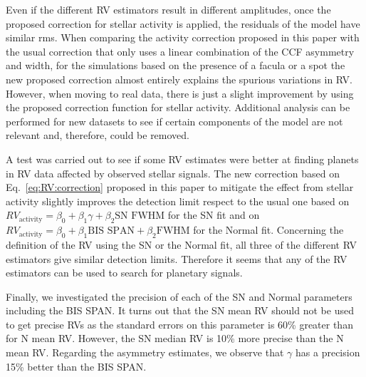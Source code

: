 \documentclass{aa}
\begin{document}
Even if the different RV estimators result in different amplitudes, once the proposed correction for stellar activity is applied, the residuals of the model have similar rms.
When comparing the activity correction proposed in this paper with the usual correction that only uses a linear combination of the CCF asymmetry and width, for the simulations based on the presence of a facula or a spot the new proposed correction almost entirely explains the spurious variations in RV. However, when moving to real data, there is just a slight improvement by using the proposed correction function for stellar activity. 
Additional analysis can be performed for new datasets to see if certain components of the model are not relevant and, therefore, could be removed.

A test was carried out to see if some RV estimates were better at finding planets in RV data affected by observed stellar signals. The new correction based on Eq.~\eqref{eq:RV:correction} proposed in this paper to mitigate the effect from stellar activity slightly improves the detection limit respect to the usual one based on $RV_{\text{activity}}=\beta_0+\beta_1 \gamma + \beta_2 \text{SN FWHM}$ for the SN fit and on $RV_{\text{activity}}=\beta_0+\beta_1 \text{BIS SPAN} + \beta_2 \text{FWHM}$ for the Normal fit.
Concerning the definition of the RV using the SN or the Normal fit, all three of the different RV estimators give similar detection limits. Therefore it seems that any of the RV estimators can be used to search for planetary signals.

Finally, we investigated the precision of each of the SN and Normal parameters including the BIS SPAN. It turns out that the SN mean RV should not be used to get precise RVs as the standard errors on this parameter is 60\% greater than for N mean RV. 
However, the SN median RV is 10\% more precise than the N mean RV. 
Regarding the asymmetry estimates, we observe that $\gamma$ has a precision 15\% better than the BIS SPAN.








\end{document}
